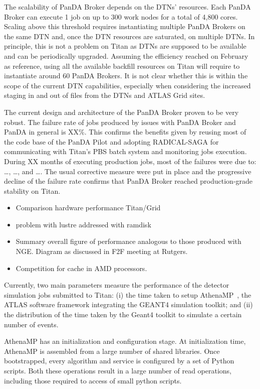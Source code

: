 The scalability of PanDA Broker depends on the DTNs' resources. Each PanDA
Broker can execute 1 job on up to 300 work nodes for a total of 4,800 cores.
Scaling above this threshold requires instantiating multiple PanDA Brokers on
the same DTN and, once the DTN resources are saturated, on multiple DTNs. In
principle, this is not a problem on Titan as DTNs are supposed to be available
and can be periodically upgraded. Assuming the efficiency reached on February as
reference, using all the available backfill resources on Titan will require to
instantiate around 60 PanDA Brokers. It is not clear whether this is within the
scope of the current DTN capabilities, especially when considering the increased
staging in and out of files from the DTNs and ATLAS Grid sites.

The current design and architecture of the PanDA Broker proven to be very
robust. The failure rate of jobs produced by issues with PanDA Broker and PanDA
in general is XX\%. This confirms the benefits given by reusing most of the code
base of the PanDA Pilot and adopting RADICAL-SAGA for communicating with Titan's
PBS batch system and monitoring jobs execution. During XX months of executing
production jobs, most of the failures were due to: \ldots, \ldots, and \ldots.
The usual corrective measure were put in place and the progressive decline of
the failure rate confirms that PanDA Broker reached production-grade stability
on Titan.

\begin{itemize}
    \item Comparison hardware performance Titan/Grid
    \item problem with lustre addressed with ramdisk
    \item Summary overall figure of performance analogous to those produced with NGE. Diagram as discussed in F2F meeting at Rutgers.
    \item Competition for cache in AMD processors.
\end{itemize}

Currently, two main parameters measure the performance of the detector
simulation jobs submitted to Titan: (i) the time taken to setup
AthenaMP~\cite{aad2010atlas}, the ATLAS software framework integrating the
GEANT4 simulation toolkit; and (ii) the distribution of the time taken by the
Geant4 toolkit to simulate a certain number of events.

AthenaMP has an initialization and configuration stage. At initialization time,
AthenaMP is  assembled from a large number of shared libraries. Once
bootstrapped, every algorithm and service is configured by a set of Python
scripts. Both these operations result in a large number of read operations,
including those required to  access of small python scripts.


